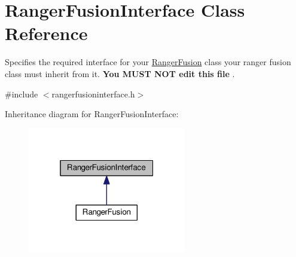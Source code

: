 \hypertarget{classRangerFusionInterface}{}\section{Ranger\+Fusion\+Interface Class Reference}
\label{classRangerFusionInterface}


Specifies the required interface for your \hyperlink{classRangerFusion}{Ranger\+Fusion} class your ranger fusion class must inherit from it. {\bfseries  You M\+U\+ST N\+OT edit this file }.  




{\ttfamily \#include $<$rangerfusioninterface.\+h$>$}



Inheritance diagram for Ranger\+Fusion\+Interface\+:
\nopagebreak
\begin{figure}[H]
\begin{center}
\leavevmode
\includegraphics[width=196pt]{classRangerFusionInterface__inherit__graph}
\end{center}
\end{figure}
